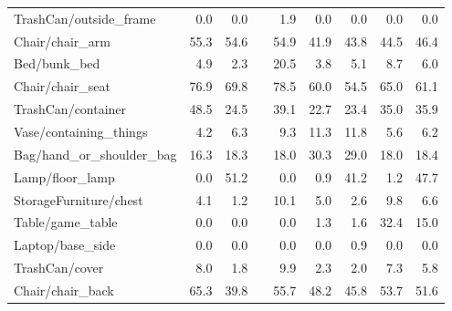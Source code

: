 \begin{table}[!h]
\begin{tabular}{lrrrrrrrr}
TrashCan/outside\_frame   &              0.0 &                  0.0 &&     1.9 &             0.0 &                     0.0 &           0.0 &                   0.0 \\
Chair/chair\_arm          &             55.3 &                 54.6 &&    54.9 &            41.9 &                    43.8 &          44.5 &                  46.4 \\
Bed/bunk\_bed             &              4.9 &                  2.3 &&    20.5 &             3.8 &                     5.1 &           8.7 &                   6.0 \\
Chair/chair\_seat         &             76.9 &                 69.8 &&    78.5 &            60.0 &                    54.5 &          65.0 &                  61.1 \\
TrashCan/container       &             48.5 &                 24.5 &&    39.1 &            22.7 &                    23.4 &          35.0 &                  35.9 \\
Vase/containing\_things   &              4.2 &                  6.3 &&     9.3 &            11.3 &                    11.8 &           5.6 &                   6.2 \\
Bag/hand\_or\_shoulder\_bag &             16.3 &                 18.3 &&    18.0 &            30.3 &                    29.0 &          18.0 &                  18.4 \\
Lamp/floor\_lamp          &              0.0 &                 51.2 &&     0.0 &             0.9 &                    41.2 &           1.2 &                  47.7 \\
StorageFurniture/chest   &              4.1 &                  1.2 &&    10.1 &             5.0 &                     2.6 &           9.8 &                   6.6 \\
Table/game\_table         &              0.0 &                  0.0 &&     0.0 &             1.3 &                     1.6 &          32.4 &                  15.0 \\
Laptop/base\_side         &              0.0 &                  0.0 &&     0.0 &             0.0 &                     0.9 &           0.0 &                   0.0 \\
TrashCan/cover           &              8.0 &                  1.8 &&     9.9 &             2.3 &                     2.0 &           7.3 &                   5.8 \\
Chair/chair\_back         &             65.3 &                 39.8 &&    55.7 &            48.2 &                    45.8 &          53.7 &                  51.6 \\

\end{tabular}
\end{table}
